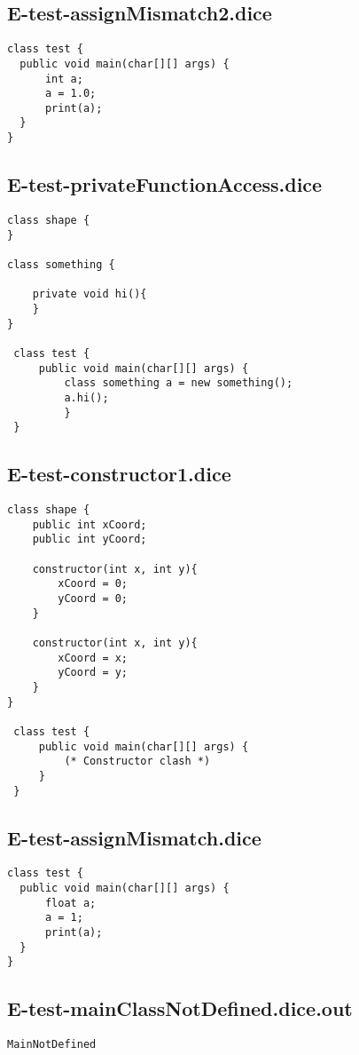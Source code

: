 \subsection{E-test-assignMismatch2.dice}
\begin{verbatim}
class test {
  public void main(char[][] args) {
      int a;
      a = 1.0;
      print(a);
  }
}
\end{verbatim}
\pagebreak
\subsection{E-test-privateFunctionAccess.dice}
\begin{verbatim}
class shape {
}

class something {
	
	private void hi(){
	}
}

 class test {
	 public void main(char[][] args) {
		 class something a = new something();
		 a.hi();		 
		 }
 }
\end{verbatim}
\pagebreak
\subsection{E-test-constructor1.dice}
\begin{verbatim}
class shape {
	public int xCoord;
	public int yCoord;
	
	constructor(int x, int y){
		xCoord = 0;
		yCoord = 0;
	}

	constructor(int x, int y){
		xCoord = x;
		yCoord = y;
	}
}

 class test {
	 public void main(char[][] args) {
		 (* Constructor clash *)
	 }
 }
\end{verbatim}
\pagebreak
\subsection{E-test-assignMismatch.dice}
\begin{verbatim}
class test {
  public void main(char[][] args) {
      float a;
      a = 1;
      print(a);
  }
}
\end{verbatim}
\pagebreak
\subsection{E-test-mainClassNotDefined.dice.out}
\begin{verbatim}
MainNotDefined 

\end{verbatim}
\pagebreak
